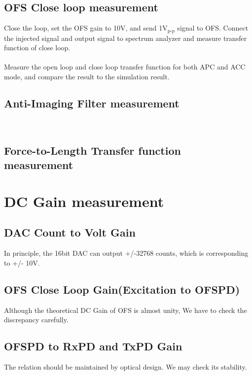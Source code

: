 \subsection{OFS Close loop measurement}
Close the loop, set the OFS gain to 10V, and send 1$\mbox{V}_{\mbox{p-p}}$ signal to OFS. Connect the injected signal and output signal to spectrum analyzer and measure transfer function of close loop.
\\\\
\noindent Measure the open loop and close loop transfer function for both APC and ACC mode, and compare the result to the simulation result.

\subsection{Anti-Imaging Filter measurement}
     \\
    
\subsection{Force-to-Length Transfer function measurement}
\section{DC Gain measurement}
\subsection{DAC Count to Volt Gain}
    In principle, the 16bit DAC can output +/-32768 counts, which is corresponding to +/- 10V. 
\subsection{OFS Close Loop Gain(Excitation to OFSPD)}
    Although the theoretical DC Gain of OFS is almost unity, We have to check the discrepancy carefully. 
\subsection{OFSPD to RxPD and TxPD Gain}
    The relation should be maintained by optical design. We may check its stability.
